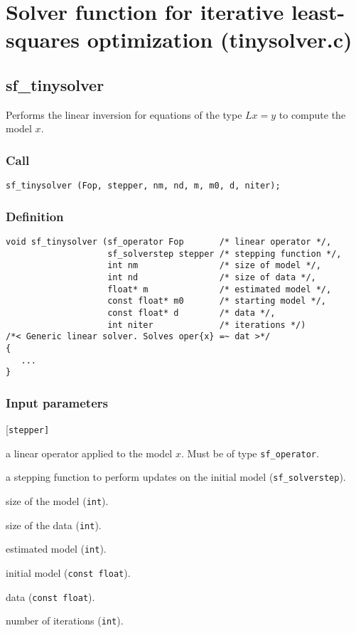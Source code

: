 \section{Solver function for iterative least-squares optimization (tinysolver.c)}




\subsection{{sf\_tinysolver}}
Performs the linear inversion for equations of the type $Lx=y$ to compute the model $x$.

\subsubsection*{Call}
\begin{verbatim}sf_tinysolver (Fop, stepper, nm, nd, m, m0, d, niter);\end{verbatim}


\subsubsection*{Definition}
\begin{verbatim}
void sf_tinysolver (sf_operator Fop       /* linear operator */, 
                    sf_solverstep stepper /* stepping function */, 
                    int nm                /* size of model */, 
                    int nd                /* size of data */, 
                    float* m              /* estimated model */,
                    const float* m0       /* starting model */,
                    const float* d        /* data */, 
                    int niter             /* iterations */)
/*< Generic linear solver. Solves oper{x} =~ dat >*/
{
   ...
}
\end{verbatim}


\subsubsection*{Input parameters}
\begin{desclist}{\tt }{\quad}[\tt stepper]
   \setlength\itemsep{0pt}
   \item[Fop]     a linear operator applied to the model $x$.  Must be of type \texttt{sf\_operator}. 
   \item[stepper] a stepping function to perform updates on the initial model (\texttt{sf\_solverstep}). 
   \item[nm]      size of the model (\texttt{int}). 
   \item[nd]      size of the data (\texttt{int}). 
   \item[m]       estimated model (\texttt{int}). 
   \item[mo]      initial model (\texttt{const float}). 
   \item[d]       data (\texttt{const float}). 
   \item[niter]   number of iterations (\texttt{int}).
\end{desclist}


